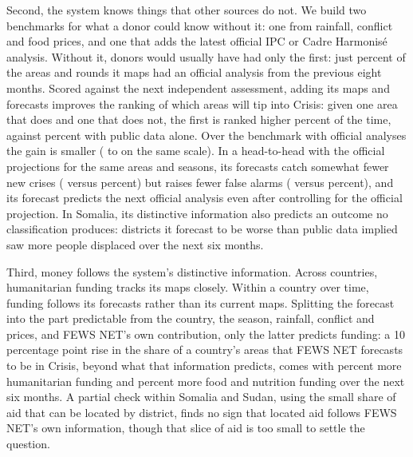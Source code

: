 \documentclass[11pt]{article}
\begin{document}
Second, the system knows things that other sources do not. We build two benchmarks for what a donor could know without it: one from rainfall, conflict and food prices, and one that adds the latest official IPC or Cadre Harmonis\'e analysis. Without it, donors would usually have had only the first: just \shareWithIndependent{} percent of the areas and rounds it maps had an official analysis from the previous eight months. Scored against the next independent assessment, adding its maps and forecasts improves the ranking of which areas will tip into Crisis: given one area that does and one that does not, the first is ranked higher \aucRawFewsPct{} percent of the time, against \aucRawPct{} percent with public data alone. Over the benchmark with official analyses the gain is smaller (\aucRawIPC{} to \aucRawIPCFews{} on the same scale). In a head-to-head with the official projections for the same areas and seasons, its forecasts catch somewhat fewer new crises (\offHitFews{} versus \offHitOfficial{} percent) but raises fewer false alarms (\offFaFews{} versus \offFaOfficial{} percent), and its forecast predicts the next official analysis even after controlling for the official projection. In Somalia, its distinctive information also predicts an outcome no classification produces: districts it forecast to be worse than public data implied saw more people displaced over the next six months.

Third, money follows the system's distinctive information. Across countries, humanitarian funding tracks its maps closely. Within a country over time, funding follows its forecasts rather than its current maps. Splitting the forecast into the part predictable from the country, the season, rainfall, conflict and prices, and FEWS NET's own contribution, only the latter predicts funding: a 10 percentage point rise in the share of a country's areas that FEWS NET forecasts to be in Crisis, beyond what that information predicts, comes with \moneyRawAllContrib{} percent more humanitarian funding and \moneyRawFoodContrib{} percent more food and nutrition funding over the next six months. A partial check within Somalia and Sudan, using the small share of aid that can be located by district, finds no sign that located aid follows FEWS NET's own information, though that slice of aid is too small to settle the question.
\end{document}
